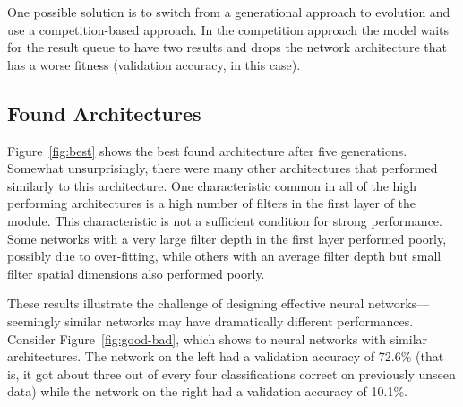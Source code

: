 \documentclass[conference]{IEEEtran}
\begin{document}
One possible solution is to switch from a generational approach to evolution
and use a competition-based approach. In the competition approach the model
waits for the result queue to have two results and drops the network architecture
that has a worse fitness (validation accuracy, in this case).

\subsection{Found Architectures}
Figure~\ref{fig:best} shows the best found architecture after five generations.
Somewhat unsurprisingly, there were many other architectures that performed
similarly to this architecture. One characteristic common in all of the high
performing architectures is a high number of filters in the first layer of
the module. This characteristic is not a sufficient condition for strong
performance. Some networks with a very large filter depth in the first layer
performed poorly, possibly due to over-fitting, while others with an average
filter depth but small filter spatial dimensions also performed poorly.

These results illustrate the challenge of designing effective neural
networks---seemingly similar networks may have dramatically different
performances. Consider Figure~\ref{fig:good-bad}, which shows to neural
networks with similar architectures. The network on the left had a validation
accuracy of 72.6\% (that is, it got about three out of every four classifications
correct on previously unseen data) while the network on the right had a
validation accuracy of 10.1\%.
\end{document}
